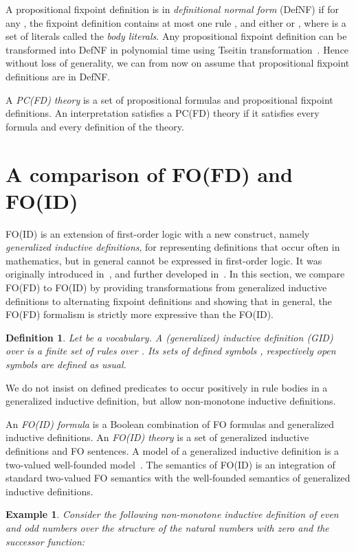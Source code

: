 \documentclass{tlp}
\newtheorem{example}[lemma]{Example}
\newtheorem{definition}[lemma]{Definition}
\begin{document}
A propositional fixpoint definition  is in {\em definitional normal form} (DefNF) if for any , the fixpoint definition contains at most one rule , and either  or , where  is a set of literals called the {\em body literals}. Any propositional fixpoint definition can be transformed into DefNF in polynomial time using Tseitin transformation~\cite{Tseitin68eng}. Hence without loss of generality, we can from now on assume that propositional fixpoint definitions are in DefNF.

A {\em PC(FD) theory} is a set of propositional formulas and propositional fixpoint definitions. An interpretation  satisfies a PC(FD) theory if it satisfies every formula and every definition of the theory.

\section{A comparison of FO(FD) and FO(ID)}\label{sec:gid}
FO(ID) is an extension of first-order logic with a new construct, namely {\em generalized inductive definitions}, for representing definitions that occur often in mathematics, but in general cannot be expressed in first-order logic. It was originally introduced in~\cite{Denecker:CL2000}, and further developed in~\cite{tocl/DeneckerT08}. In this section, we compare FO(FD) to FO(ID) by providing transformations from generalized inductive definitions to alternating fixpoint definitions and showing that in general, the FO(FD) formalism is strictly more expressive than the FO(ID).

\begin{definition}
Let  be a vocabulary. A {\em (generalized) inductive definition (GID)}  over  is a finite set of rules over . Its sets of defined symbols
, respectively open symbols  are defined as usual.
\end{definition}
We do not insist on defined predicates to occur positively in rule bodies in a
generalized inductive definition, but allow non-monotone inductive definitions.

An {\em FO(ID) formula} is a Boolean combination of FO formulas and
generalized inductive definitions. An {\em FO(ID) theory} is a set of
generalized inductive definitions and FO sentences. A model of a generalized inductive definition is a two-valued well-founded model~\cite{tocl/DeneckerT08}. The semantics of FO(ID) is an integration of standard two-valued FO semantics with the well-founded semantics of generalized inductive definitions.

\begin{example}
Consider the following non-monotone inductive definition of even
and odd numbers over the structure of the natural numbers with zero and the successor function:

\end{example}
\end{document}
